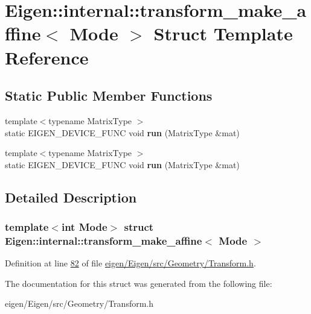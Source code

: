 \hypertarget{struct_eigen_1_1internal_1_1transform__make__affine}{}\section{Eigen\+:\+:internal\+:\+:transform\+\_\+make\+\_\+affine$<$ Mode $>$ Struct Template Reference}
\label{struct_eigen_1_1internal_1_1transform__make__affine}
\subsection*{Static Public Member Functions}
\begin{DoxyCompactItemize}
\item 
\mbox{\label{struct_eigen_1_1internal_1_1transform__make__affine_abb9f3640b1b651e52f356edc84d60bcc}} 
{\footnotesize template$<$typename Matrix\+Type $>$ }\\static E\+I\+G\+E\+N\+\_\+\+D\+E\+V\+I\+C\+E\+\_\+\+F\+U\+NC void {\bfseries run} (Matrix\+Type \&mat)
\item 
\mbox{\label{struct_eigen_1_1internal_1_1transform__make__affine_abb9f3640b1b651e52f356edc84d60bcc}} 
{\footnotesize template$<$typename Matrix\+Type $>$ }\\static E\+I\+G\+E\+N\+\_\+\+D\+E\+V\+I\+C\+E\+\_\+\+F\+U\+NC void {\bfseries run} (Matrix\+Type \&mat)
\end{DoxyCompactItemize}


\subsection{Detailed Description}
\subsubsection*{template$<$int Mode$>$\newline
struct Eigen\+::internal\+::transform\+\_\+make\+\_\+affine$<$ Mode $>$}



Definition at line \hyperlink{eigen_2_eigen_2src_2_geometry_2_transform_8h_source_l00082}{82} of file \hyperlink{eigen_2_eigen_2src_2_geometry_2_transform_8h_source}{eigen/\+Eigen/src/\+Geometry/\+Transform.\+h}.



The documentation for this struct was generated from the following file\+:\begin{DoxyCompactItemize}
\item 
eigen/\+Eigen/src/\+Geometry/\+Transform.\+h\end{DoxyCompactItemize}

